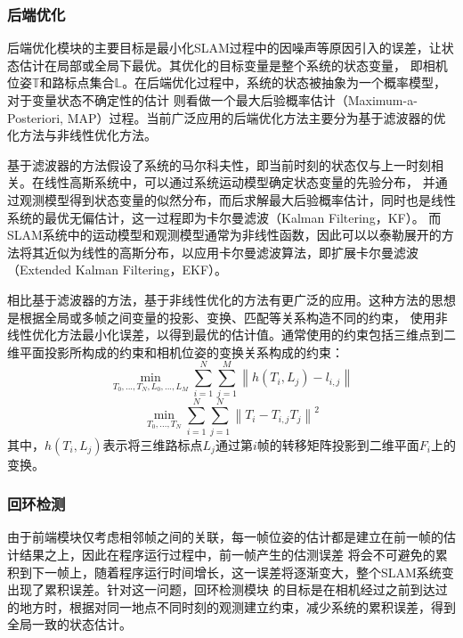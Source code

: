 \subsubsection{后端优化}
后端优化模块的主要目标是最小化SLAM过程中的因噪声等原因引入的误差，让状态估计在局部或全局下最优。其优化的目标变量是整个系统的状态变量，
即相机位姿$\mathbb{T}$和路标点集合$\mathbb{L}$。在后端优化过程中，系统的状态被抽象为一个概率模型，对于变量状态不确定性的估计
则看做一个最大后验概率估计（Maximum-a-Posteriori, MAP）过程。当前广泛应用的后端优化方法主要分为基于滤波器的优化方法与非线性优化方法。

基于滤波器的方法假设了系统的马尔科夫性，即当前时刻的状态仅与上一时刻相关。在线性高斯系统中，可以通过系统运动模型确定状态变量的先验分布，
并通过观测模型得到状态变量的似然分布，而后求解最大后验概率估计，同时也是线性系统的最优无偏估计，这一过程即为卡尔曼滤波（Kalman Filtering，KF）。
而SLAM系统中的运动模型和观测模型通常为非线性函数，因此可以以泰勒展开的方法将其近似为线性的高斯分布，以应用卡尔曼滤波算法，即扩展卡尔曼滤波（Extended Kalman Filtering，EKF）。

相比基于滤波器的方法，基于非线性优化的方法有更广泛的应用。这种方法的思想是根据全局或多帧之间变量的投影、变换、匹配等关系构造不同的约束，
使用非线性优化方法最小化误差，以得到最优的估计值。通常使用的约束包括三维点到二维平面投影所构成的约束和相机位姿的变换关系构成的约束：
$$\mathop{min}\limits_{T_{0},...,T_{N},L_{0},...,L_{M}}\sum\limits_{i=1}^{N}\sum\limits_{j=1}^{M}\left \| h(T_{i},L_{j})-l_{i,j} \right \|$$
$$\mathop{min}\limits_{T_{0},...,T_{N}}\sum\limits_{i=1}^{N}\sum\limits_{j=1}^{N}\left \| T_{i}-T_{i,j}T_{j} \right \|^{2}$$
其中，$h(T_{i},L_{j})$表示将三维路标点$L_{j}$通过第$i$帧的转移矩阵投影到二维平面$F_{i}$上的变换。

\subsubsection{回环检测}
由于前端模块仅考虑相邻帧之间的关联，每一帧位姿的估计都是建立在前一帧的估计结果之上，因此在程序运行过程中，前一帧产生的估测误差
将会不可避免的累积到下一帧上，随着程序运行时间增长，这一误差将逐渐变大，整个SLAM系统变出现了累积误差。针对这一问题，回环检测模块
的目标是在相机经过之前到达过的地方时，根据对同一地点不同时刻的观测建立约束，减少系统的累积误差，得到全局一致的状态估计。

